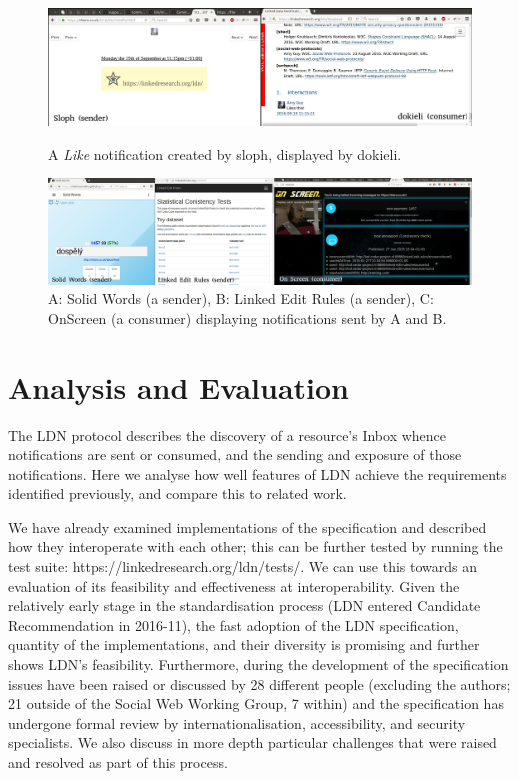 \documentclass[a4paper]{llncs}
\begin{document}
\begin{figure}
  \includegraphics[width=\textwidth]{media/images/screenshot-ldn-sloph-dokieli}
  \caption{A {\em Like} notification created by sloph, displayed by dokieli.}
  \label{fig:like}

  \includegraphics[width=\textwidth]{media/images/screenshot-ldn-senders}
  \caption{A: Solid Words (a sender), B: Linked Edit Rules (a sender), C: OnScreen (a consumer) displaying notifications sent by A and B.}
  \label{fig:notifications}
\end{figure}












                        \section{Analysis and Evaluation}
  \label{analysis-and-evaluation}



\par The LDN protocol describes the discovery of a resource’s Inbox whence notifications are sent or consumed, and the sending and exposure of those notifications. Here we analyse how well features of LDN achieve the \empty requirements identified previously, and compare this to related work.


\par We have already examined \empty implementations of the specification and described how they interoperate with each other; this can be further tested by running the \empty test suite: https://linkedresearch.org/ldn/tests/. We can use this towards an evaluation of its feasibility and effectiveness at interoperability. Given the relatively early stage in the standardisation process (LDN entered Candidate Recommendation in 2016-11), the fast adoption of the LDN specification, quantity of the implementations, and their diversity is promising and further shows LDN’s feasibility. Furthermore, during the development of the specification issues have been raised or discussed by 28 different people (excluding the authors; 21 outside of the Social Web Working Group, 7 within) and the specification has undergone formal review by internationalisation, accessibility, and security specialists. We also discuss in more depth particular challenges that were raised and resolved as part of this process.
\end{document}
